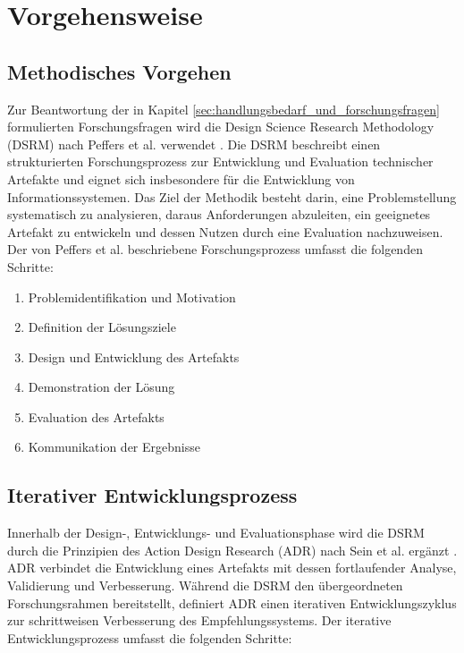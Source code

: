 \chapter{Vorgehensweise} \label{chap:vorgehensweise} 

\section{Methodisches Vorgehen}
Zur Beantwortung der in Kapitel \ref{sec:handlungsbedarf_und_forschungsfragen} formulierten Forschungsfragen wird die Design Science Research Methodology (DSRM) nach Peffers et al. verwendet \parencite{peffers2007dsrm}. 
Die DSRM beschreibt einen strukturierten Forschungsprozess zur Entwicklung und Evaluation technischer Artefakte und eignet sich insbesondere für die Entwicklung von Informationssystemen. 
Das Ziel der Methodik besteht darin, eine Problemstellung systematisch zu analysieren, daraus Anforderungen abzuleiten, ein geeignetes Artefakt zu entwickeln und dessen Nutzen durch eine Evaluation nachzuweisen. 
Der von Peffers et al. beschriebene Forschungsprozess umfasst die folgenden Schritte: 

\begin{enumerate} 
    \item Problemidentifikation und Motivation 
    \item Definition der Lösungsziele 
    \item Design und Entwicklung des Artefakts 
    \item Demonstration der Lösung 
    \item Evaluation des Artefakts 
    \item Kommunikation der Ergebnisse 
\end{enumerate} 

\section{Iterativer Entwicklungsprozess} 
Innerhalb der Design-, Entwicklungs- und Evaluationsphase wird die DSRM durch die Prinzipien des Action Design Research (ADR) nach Sein et al. ergänzt \parencite{sein2011adr}. 
ADR verbindet die Entwicklung eines Artefakts mit dessen fortlaufender Analyse, Validierung und Verbesserung. Während die DSRM den übergeordneten Forschungsrahmen bereitstellt, 
definiert ADR einen iterativen Entwicklungszyklus zur schrittweisen Verbesserung des Empfehlungssystems. Der iterative Entwicklungsprozess umfasst die folgenden Schritte: 

